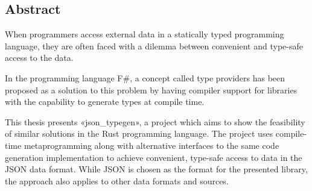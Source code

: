 
\vspace*{2cm}
\thispagestyle{plain}

\begin{center}

{}

\section*{\hfil Abstract \hfil}

\end{center}

When programmers access external data in a statically typed programming language, they are often faced with a dilemma between convenient and type-safe access to the data.

In the programming language F\#, a concept called type providers has been proposed as a solution to this problem by having compiler support for libraries with the capability to generate types at compile time.

This thesis presents «json_typegen», a project which aims to show the feasibility of similar solutions in the Rust programming language. The project uses compile-time metaprogramming along with alternative interfaces to the same code generation implementation to achieve convenient, type-safe access to data in the JSON data format. While JSON is chosen as the format for the presented library, the approach also applies to other data formats and sources.
